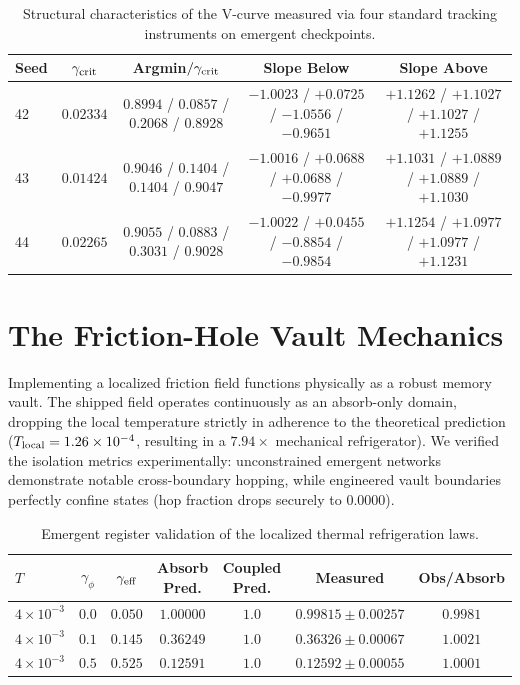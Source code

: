 \documentclass{article}
\begin{document}
\begin{table}[!htb]\centering\small
\caption{Structural characteristics of the V-curve measured via four standard tracking instruments on emergent checkpoints.}
\begin{tabular}{lcccc}
\toprule
Seed & $\gamma_{\rm crit}$ & Argmin$/\gamma_{\rm crit}$ & Slope Below & Slope Above\\
\midrule
42 & $0.02334$ & $0.8994$ / $0.0857$ / $0.2068$ / $0.8928$ & $-1.0023$ / $+0.0725$ / $-1.0556$ / $-0.9651$ & $+1.1262$ / $+1.1027$ / $+1.1027$ / $+1.1255$\\
43 & $0.01424$ & $0.9046$ / $0.1404$ / $0.1404$ / $0.9047$ & $-1.0016$ / $+0.0688$ / $+0.0688$ / $-0.9977$ & $+1.1031$ / $+1.0889$ / $+1.0889$ / $+1.1030$\\
44 & $0.02265$ & $0.9055$ / $0.0883$ / $0.3031$ / $0.9028$ & $-1.0022$ / $+0.0455$ / $-0.8854$ / $-0.9854$ & $+1.1254$ / $+1.0977$ / $+1.0977$ / $+1.1231$\\
\bottomrule
\end{tabular}
\end{table}

\section{The Friction-Hole Vault Mechanics}\label{app:vault}

Implementing a localized friction field functions physically as a robust memory vault. The shipped field operates continuously as an absorb-only domain, dropping the local temperature strictly in adherence to the theoretical prediction ($T_{\rm local}=1.26\times10^{-4}$, resulting in a $7.94\times$ mechanical refrigerator). We verified the isolation metrics experimentally: unconstrained emergent networks demonstrate notable cross-boundary hopping, while engineered vault boundaries perfectly confine states (hop fraction drops securely to $0.0000$).

\begin{table}[!htb]\centering
\caption{Emergent register validation of the localized thermal refrigeration laws.}
\begin{tabular}{lcccccc}
\toprule
$T$ & $\gamma_\phi$ & $\gamma_{\rm eff}$ & Absorb Pred. & Coupled Pred. & Measured & Obs/Absorb\\
\midrule
$4\times10^{-3}$ & $0.0$ & $0.050$ & $1.00000$ & $1.0$ & $0.99815\pm0.00257$ & $0.9981$\\
$4\times10^{-3}$ & $0.1$ & $0.145$ & $0.36249$ & $1.0$ & $0.36326\pm0.00067$ & $1.0021$\\
$4\times10^{-3}$ & $0.5$ & $0.525$ & $0.12591$ & $1.0$ & $0.12592\pm0.00055$ & $1.0001$\\
\bottomrule
\end{tabular}
\end{table}
\end{document}
